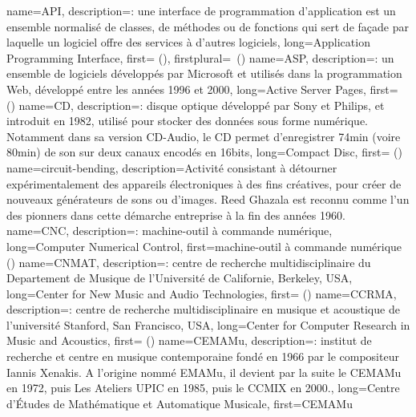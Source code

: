 {
    name={API},
    description={\textit{}: une interface de programmation d’application est un ensemble normalisé de classes, de méthodes ou de fonctions qui sert de façade par laquelle un logiciel offre des services à d'autres logiciels},
    long={Application Programming Interface},
    first={ ()},
    firstplural={\glspluralsuffix\ (\glspluralsuffix)}
}
{
    name={ASP},
    description={\textit{}: un ensemble de logiciels développés par Microsoft et utilisés dans la programmation Web, développé entre les années 1996 et 2000},
    long={Active Server Pages},
    first={ ()}
}
{
    name={CD},
    description={\textit{}: disque optique développé par Sony et Philips, et introduit en 1982, utilisé pour stocker des données sous forme numérique. Notamment dans sa version CD-Audio, le CD permet d'enregistrer 74min (voire 80min) de son sur deux canaux encodés en 16bits},
    long={Compact Disc},
    first={ ()}
}
{
    name={circuit-bending},
    description={Activité consistant à détourner expérimentalement des appareils électroniques à des fins créatives, pour créer de nouveaux générateurs de sons ou d'images. Reed Ghazala est reconnu comme l'un des pionners dans cette démarche entreprise à la fin des années 1960.}
}
{
    name={CNC},
    description={\textit{}: machine-outil à commande numérique},
    long={Computer Numerical Control},
    first={machine-outil à commande numérique ()}
}
{
    name={CNMAT},
    description={\textit{}: centre de recherche multidisciplinaire du Departement de Musique de l'Université de Californie, Berkeley, USA},
    long={Center for New Music and Audio Technologies},
    first={ ()}
}
{
    name={CCRMA},
    description={\textit{}: centre de recherche multidisciplinaire en musique et acoustique de l'université Stanford, San Francisco, USA},
    long={Center for Computer Research in Music and Acoustics},
    first={ ()}
}
{
    name={CEMAMu},
    description={\textit{}: institut de recherche et centre en musique contemporaine fondé en 1966 par le compositeur Iannis Xenakis. A l'origine nommé EMAMu, il devient par la suite le CEMAMu en 1972, puis Les Ateliers UPIC en 1985, puis le CCMIX en 2000.},
    long={Centre d'Études de Mathématique et Automatique Musicale},
    first={CEMAMu}
}
